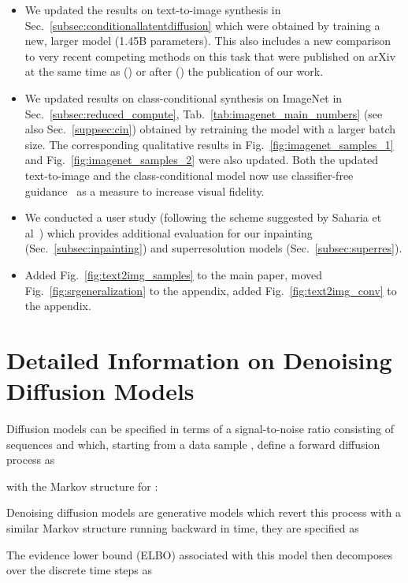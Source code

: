 \documentclass[10pt,twocolumn,letterpaper]{article}
\begin{document}
\begin{itemize}
\item We updated the results on text-to-image synthesis in Sec.~\ref{subsec:conditionallatentdiffusion} which were obtained by training a new, larger model (1.45B parameters). This also includes a new comparison to very recent competing methods on this task that were published on arXiv at the same time as (\cite{DBLP:journals/corr/abs-2112-10741, DBLP:journals/corr/abs-2111-13792}) or after (\cite{DBLP:journals/corr/abs-2203-13131}) the publication of our work.
\item We updated results on class-conditional synthesis on ImageNet in Sec.~\ref{subsec:reduced_compute}, Tab.~\ref{tab:imagenet_main_numbers} (see also Sec.~\ref{suppsec:cin}) obtained by retraining the model with a larger batch size.
The corresponding qualitative results in Fig.~\ref{fig:imagenet_samples_1} and Fig.~\ref{fig:imagenet_samples_2} were also updated. Both the updated text-to-image and the class-conditional model now use classifier-free guidance~\cite{ho2021classifier} as a measure to increase visual fidelity.
\item We conducted a user study (following the scheme suggested by Saharia et al~\cite{DBLP:journals/corr/abs-2104-07636}) which provides additional evaluation for our inpainting (Sec.~\ref{subsec:inpainting}) and superresolution models (Sec.~\ref{subsec:superres}).
\item Added Fig.~\ref{fig:text2img_samples} to the main paper, moved Fig.~\ref{fig:srgeneralization} to the appendix, added Fig.~\ref{fig:text2img_conv} to the appendix.
\end{itemize}


\newcommand{\normal}{\mathcal{N}}
\newcommand{\I}{\mathbb{I}}
\newcommand{\snr}{\text{SNR}}
\section{Detailed Information on Denoising Diffusion Models}
\label{suppsec:dmdetails}
Diffusion models can be specified in terms of a signal-to-noise ratio
 consisting
of sequences  and  which, starting from
a data sample , define a forward diffusion process  as

with the Markov structure for :


Denoising diffusion models are generative models  which revert this
process with a similar Markov structure running backward in time, \ie they are
specified as

The evidence lower bound (ELBO) associated with this model then decomposes over
the discrete time steps as
\end{document}
